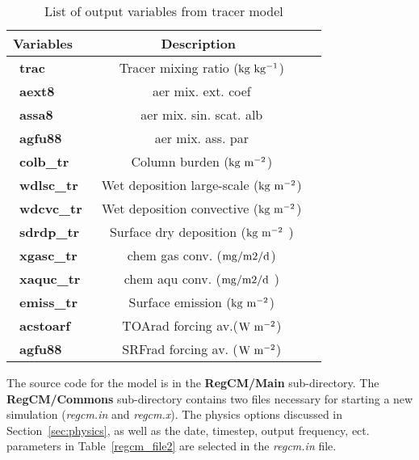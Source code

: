 \begin{table}[!]
\begin{center}
\caption{List of output variables from tracer model}  \label{che_var}
\vspace{0.25cm}
\begin{tabular}{|l|c|l|} \hline \hline
{\small {\bf Variables}} & {\small {\bf Description}} \\ \hline \hline
{\ {\bf trac}}        & {\ Tracer mixing ratio (${\rm kg~kg^{-1}}$)  }      \\ \hline
{\ {\bf aext8}}        & {\ aer mix. ext. coef }      \\ \hline
{\ {\bf assa8}}        & {\ aer mix. sin. scat. alb}      \\ \hline
{\ {\bf agfu88}}        & {\ aer mix. ass. par}      \\ \hline
{\ {\bf colb\_tr}}    & {\ Column burden (${\rm kg~m^{-2}}$)}  \\ \hline
{\ {\bf wdlsc\_tr}}    & {\ Wet deposition large-scale (${\rm kg~m^{-2}}$) }      \\ \hline
{\ {\bf wdcvc\_tr}}    & {\ Wet deposition convective (${\rm kg~m^{-2}}$)  }   \\ \hline
{\ {\bf sdrdp\_tr}}    & {\ Surface dry deposition (${\rm kg~m^{-2}}$ ) }  \\ \hline
{\ {\bf xgasc\_tr}}    & {\ chem gas conv. (${\rm mg/m2/d}$)  }   \\ \hline
{\ {\bf xaquc\_tr}}    & {\ chem aqu conv. (${\rm mg/m2/d}$ ) }  \\ \hline
{\ {\bf emiss\_tr}}    & {\ Surface emission (${\rm kg~m^{-2}}$) }       \\ \hline
{\ {\bf acstoarf}}      & {\ TOArad forcing av.(${\rm W~m^{-2}}$)}      \\ \hline
{\ {\bf agfu88}}     & {\ SRFrad forcing av. (${\rm W~m^{-2}}$)}      \\ \hline
\end{tabular}
\end{center}
\end{table}

The source code for the model is in the {\bf RegCM/Main} sub-directory.  The 
{\bf RegCM/Commons} sub-directory contains two files necessary for starting a new 
simulation ({\it regcm.in} and {\it regcm.x}).  The physics options discussed in 
Section~\ref{sec:physics}, as well as the date, timestep,  
output frequency, ect. parameters in Table~\ref{regcm_file2} are selected in the 
{\it regcm.in} file.  

